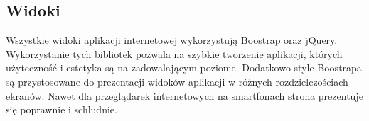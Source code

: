 \subsection{Widoki}
Wszystkie widoki aplikacji internetowej wykorzystują Boostrap oraz jQuery. Wykorzystanie tych bibliotek pozwala na szybkie tworzenie aplikacji, których użyteczność i estetyka są na zadowalającym poziome. Dodatkowo style Boostrapa są przystosowane do prezentacji widoków aplikacji w różnych rozdzielczościach ekranów. Nawet dla przeglądarek internetowych na smartfonach strona prezentuje się poprawnie i schludnie.
